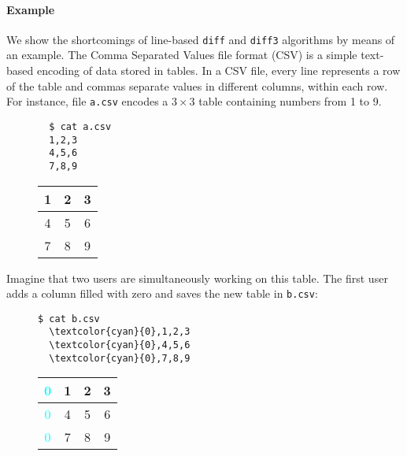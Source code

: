 \documentclass{sigplanconf}
\theoremstyle{plain}
\begin{document}
\paragraph{Example}
We show the shortcomings of line-based \texttt{diff} and
\texttt{diff3} algorithms by means of an example.  
%
The Comma Separated Values file format (CSV) is a simple text-based
encoding of data stored in tables. %
%
In a CSV file, every line represents a row of the table and commas
separate values in different columns, within each row.
%
For instance, file \texttt{a.csv} encodes a $3 \times 3$ table
containing numbers from 1 to 9.
\begin{figure}[!h]
\centering
\begin{minipage}{.15\textwidth}
{  \centering
  \begin{verbatim}
  $ cat a.csv
  1,2,3
  4,5,6
  7,8,9
  \end{verbatim}\par
}
\end{minipage}%
\begin{minipage}{.15\textwidth}
{  \centering
  \begin{tabular}{ | c | c | c | }
    \hline
    1 & 2 & 3 \\ \hline
    4 & 5 & 6 \\ \hline
    7 & 8 & 9  \\ \hline
  \end{tabular}\par
}
\end{minipage}%
\end{figure}

Imagine that two users are simultaneously working on this table.
The first user adds a column filled with zero and saves the new table in \texttt{b.csv}:
\begin{figure}[h]
\centering
\begin{minipage}{.15\textwidth}
  \centering
\begin{Verbatim}[commandchars=\\\{\}]
  $ cat b.csv
  \textcolor{cyan}{0},1,2,3
  \textcolor{cyan}{0},4,5,6
  \textcolor{cyan}{0},7,8,9
\end{Verbatim}
\end{minipage}%
\begin{minipage}{.15\textwidth}
  \centering
  \begin{tabular}{ | c | c | c | c | }
    \hline
    \textcolor{cyan}{0} & 1 & 2 & 3 \\ \hline
    \textcolor{cyan}{0} & 4 & 5 & 6 \\ \hline
    \textcolor{cyan}{0} & 7 & 8 & 9  \\ \hline
  \end{tabular}
\end{minipage}%
\end{figure} 
\end{document}
